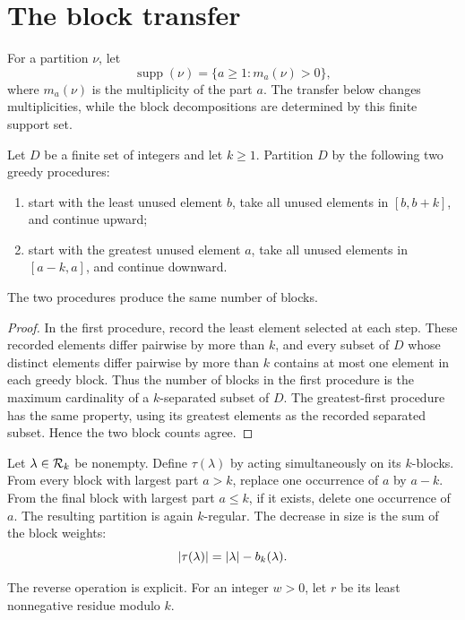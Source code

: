 \section{The block transfer}\label{sec:transfer}

For a partition $\nu$, let
\[
 \operatorname{supp}(\nu)=\{a\geq1:m_a(\nu)>0\},
\]
where $m_a(\nu)$ is the multiplicity of the part $a$. The transfer below
changes multiplicities, while the block decompositions are determined by this
finite support set.

\begin{lemma}\label{lem:greedy-interval}
Let $D$ be a finite set of integers and let $k\geq1$. Partition $D$ by the
following two greedy procedures:
\begin{enumerate}
\item start with the least unused element $b$, take all unused elements in
$[b,b+k]$, and continue upward;
\item start with the greatest unused element $a$, take all unused elements in
$[a-k,a]$, and continue downward.
\end{enumerate}
The two procedures produce the same number of blocks.
\end{lemma}

\begin{proof}
In the first procedure, record the least element selected at each step. These
recorded elements differ pairwise by more than $k$, and every subset of $D$
whose distinct elements differ pairwise by more than $k$ contains at most one
element in each greedy block. Thus the number of blocks in the first
procedure is the maximum cardinality of a $k$-separated subset of $D$.
The greatest-first procedure has the same property, using its greatest
elements as the recorded separated subset. Hence the two block counts agree.
\end{proof}

Let $\lambda\in\mathcal{R}_k$ be nonempty. Define $\tau(\lambda)$ by acting
simultaneously on its $k$-blocks. From every block with largest part $a>k$,
replace one occurrence of $a$ by $a-k$. From the final block with largest
part $a\leq k$, if it exists, delete one occurrence of $a$. The resulting
partition is again $k$-regular. The decrease in size is the sum of the block
weights:
\begin{equation}\label{eq:size-transfer}
 |\tau(\lambda)|=|\lambda|-b_k(\lambda).
\end{equation}

The reverse operation is explicit. For an integer $w>0$, let $r$ be its least
nonnegative residue modulo $k$.

